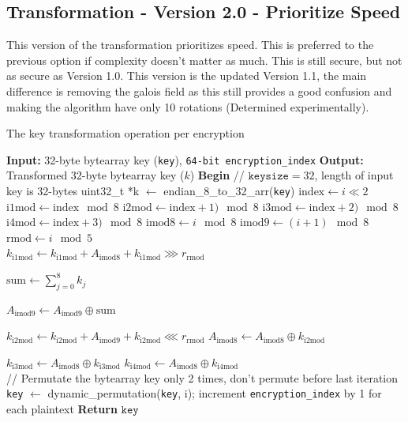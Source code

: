 \documentclass[fleqn, a4paper,12pt]{article}
\newcommand{\COMMENT}[1]{\State \textcolor[HTML]{003e57}{// #1}}
\begin{document}
\subsection{Transformation - Version 2.0 - Prioritize Speed}

This version of the transformation prioritizes speed. This is preferred to the previous option if complexity doesn't matter as much. This is still secure, but not as secure as Version 1.0. This version is the updated Version 1.1, the main difference is removing the galois field as this still provides a good confusion and making the algorithm have only 10 rotations (Determined experimentally).

\begin{algorithm}[H] %
\caption{The key transformation operation per encryption}
\begin{algorithmic}[1]  %
\State \textbf{Input:} 32-byte bytearray key (\texttt{key}), \texttt{64-bit encryption\_index}
\State \textbf{Output:} Transformed 32-byte bytearray key ($k$)
\State \textbf{Begin}
\COMMENT{$\texttt{keysize} = 32$, length of input key is 32-bytes}
\State uint32\_t *k $\gets$ endian\_8\_to\_32\_arr(\texttt{key})
	\State $\mathrm{index} \gets i \ll 2$
	\State $\mathrm{i1mod} \gets \mathrm{index} \mod 8$
	\State $\mathrm{i2mod} \gets \mathrm{index}+1) \mod 8$
	\State $\mathrm{i3mod} \gets \mathrm{index}+2) \mod 8$
	\State $\mathrm{i4mod} \gets \mathrm{index}+3) \mod 8$
	\State $\mathrm{imod8} \gets i \mod 8$
	\State $\mathrm{imod9} \gets (i+1) \mod 8$
	\State $\mathrm{rmod} \gets i \mod 5$ \\
	
	\State $k_\mathrm{i1mod} \gets k_\mathrm{i1mod} + A_\mathrm{imod8} + k_\mathrm{i1mod} \ggg r_\mathrm{rmod}$

	\State $ \mathrm{sum} \gets \displaystyle \sum_{j=0}^8 k_j$

	\State $A_\mathrm{imod9} \gets A_\mathrm{imod9} \oplus \mathrm{sum}$

	\State $k_\mathrm{i2mod} \gets k_\mathrm{i2mod} + A_\mathrm{imod9} + k_\mathrm{i2mod} \lll r_\mathrm{rmod}$
	\State $A_\mathrm{imod8} \gets A_\mathrm{imod8} \oplus k_\mathrm{i2mod}$

	\State $k_\mathrm{i3mod} \gets A_\mathrm{imod8} \oplus k_\mathrm{i3mod}$
	\State $k_\mathrm{i4mod} \gets A_\mathrm{imod8} \oplus k_\mathrm{i4mod}$ \\

	\COMMENT{Permutate the bytearray key only 2 times, don't permute before last iteration}
		\State \texttt{key} $\gets$ dynamic\_permutation(\texttt{key}, i);
	\EndIf
\EndFor
\State increment \texttt{encryption\_index} by 1 for each plaintext
\State \textbf{Return} $\texttt{key}$
\end{algorithmic}
\end{algorithm}
\end{document}
